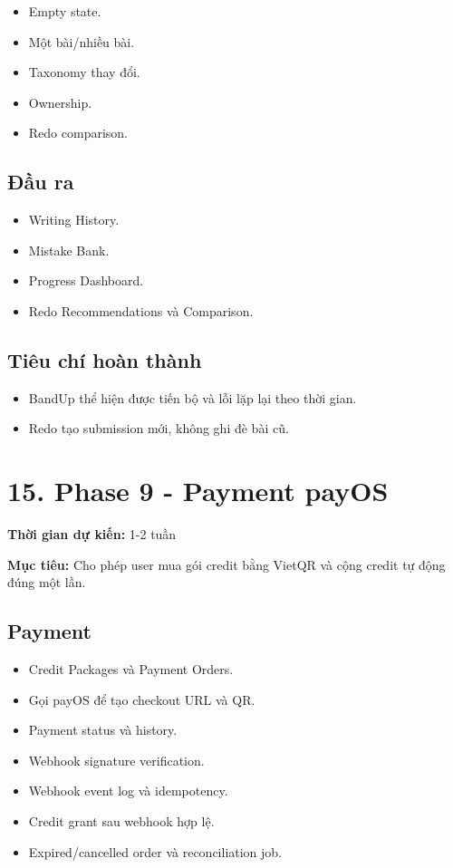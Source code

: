 \documentclass[
  11pt,
  a4paper,
]{article}
\begin{document}
\begin{itemize}
\item
  Empty state.
\item
  Một bài/nhiều bài.
\item
  Taxonomy thay đổi.
\item
  Ownership.
\item
  Redo comparison.
\end{itemize}

\subsection{Đầu ra}\label{ux111ux1ea7u-ra-8}

\begin{itemize}
\item
  Writing History.
\item
  Mistake Bank.
\item
  Progress Dashboard.
\item
  Redo Recommendations và Comparison.
\end{itemize}

\subsection{Tiêu chí hoàn
thành}\label{tiuxeau-chuxed-houxe0n-thuxe0nh-8}

\begin{itemize}
\item
  BandUp thể hiện được tiến bộ và lỗi lặp lại theo thời gian.
\item
  Redo tạo submission mới, không ghi đè bài cũ.
\end{itemize}

\section{15. Phase 9 - Payment payOS}\label{phase-9---payment-payos}

\textbf{Thời gian dự kiến:} 1-2 tuần

\textbf{Mục tiêu:} Cho phép user mua gói credit bằng VietQR và cộng
credit tự động đúng một lần.

\subsection{Payment}\label{payment}

\begin{itemize}
\item
  Credit Packages và Payment Orders.
\item
  Gọi payOS để tạo checkout URL và QR.
\item
  Payment status và history.
\item
  Webhook signature verification.
\item
  Webhook event log và idempotency.
\item
  Credit grant sau webhook hợp lệ.
\item
  Expired/cancelled order và reconciliation job.
\end{itemize}
\end{document}
